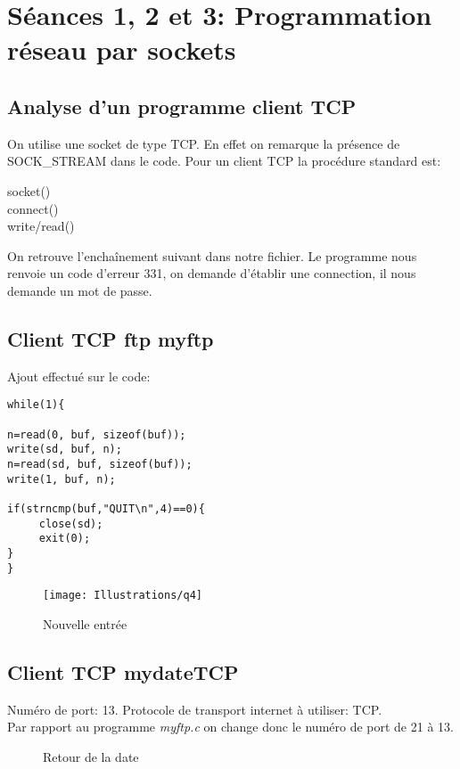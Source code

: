 \documentclass[paper=a4, fontsize=12pt]{article}
\numberwithin{equation}{section}		%
\numberwithin{figure}{section}			%
\numberwithin{table}{section}				%
\begin{document}
\section{Séances 1, 2 et 3: Programmation réseau par sockets}
\subsection{Analyse d'un programme client TCP}

On utilise une socket de type TCP. En effet on remarque la présence de SOCK\_STREAM dans le code. 
Pour un client TCP la procédure standard est:

\begin{center}
socket() \\
connect()\\
write/read()\\
\end{center}
On retrouve l'enchaînement suivant dans notre fichier.
Le programme nous renvoie un code d'erreur 331, on demande d'établir une connection, il nous demande un mot de passe.

\subsection{Client TCP ftp myftp}
Ajout effectué sur le code:
\begin{verbatim}
while(1){

n=read(0, buf, sizeof(buf));
write(sd, buf, n);
n=read(sd, buf, sizeof(buf));
write(1, buf, n);
   
if(strncmp(buf,"QUIT\n",4)==0){
     close(sd);
     exit(0);
}
}
\end{verbatim}
\begin{figure}[h!]
\centerline{\texttt{[image: Illustrations/q4]}}
\caption{\label{Illustrations/q4} Nouvelle entrée}
\end{figure}
\subsection{Client TCP mydateTCP}
Numéro de port: 13. Protocole de transport internet à utiliser: TCP.\\
Par rapport au programme \textit{myftp.c} on change donc le numéro de port de 21 à 13.
\begin{figure}[h!]
\caption{\label{Illustrations/q5}Retour de la date}
\end{figure}
\end{document}

